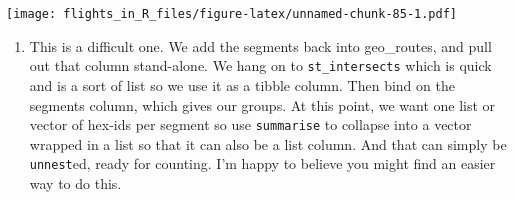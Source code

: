\documentclass[
]{book}
\newenvironment{Shaded}{\begin{snugshade}}{\end{snugshade}}
\newcommand{\AttributeTok}[1]{\textcolor[rgb]{0.77,0.63,0.00}{#1}}
\newcommand{\ConstantTok}[1]{\textcolor[rgb]{0.00,0.00,0.00}{#1}}
\newcommand{\DecValTok}[1]{\textcolor[rgb]{0.00,0.00,0.81}{#1}}
\newcommand{\FloatTok}[1]{\textcolor[rgb]{0.00,0.00,0.81}{#1}}
\newcommand{\FunctionTok}[1]{\textcolor[rgb]{0.00,0.00,0.00}{#1}}
\newcommand{\NormalTok}[1]{#1}
\newcommand{\OtherTok}[1]{\textcolor[rgb]{0.56,0.35,0.01}{#1}}
\newcommand{\SpecialCharTok}[1]{\textcolor[rgb]{0.00,0.00,0.00}{#1}}
\newcommand{\StringTok}[1]{\textcolor[rgb]{0.31,0.60,0.02}{#1}}
\providecommand{\tightlist}{%
  \setlength{\itemsep}{0pt}\setlength{\parskip}{0pt}}
\begin{document}
\begin{Shaded}
\end{Shaded}

\texttt{[image: flights\_in\_R\_files/figure-latex/unnamed-chunk-85-1.pdf]}

\begin{enumerate}
\def\labelenumi{\arabic{enumi})}
\setcounter{enumi}{1}
\tightlist
\item
  This is a difficult one. We add the segments back into geo\_routes, and pull out that column stand-alone. We hang on to \texttt{st\_intersects} which is quick and is a sort of list so we use it as a tibble column. Then bind on the segments column, which gives our groups. At this point, we want one list or vector of hex-ids per segment so use \texttt{summarise} to collapse into a vector wrapped in a list so that it can also be a list column. And that can simply be \texttt{unnest}ed, ready for counting. I'm happy to believe you might find an easier way to do this.
\end{enumerate}
\end{document}
